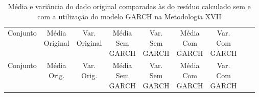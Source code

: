 \clearpage

\begin{center}
\begin{longtable}{ccccccccc}
\toprule
\rowcolor{white}
\caption[Metodologia XVII: dados estatísticos]{Média e variância do dado original
comparadas às do resíduo calculado sem e com a utilização do modelo GARCH na
Metodologia XVII} \label{tab:DadosEstatisticosMet17}\\
\midrule
    Conjunto & \specialcell{Média\\Original} &
    \specialcell{Var.\\Original} & \specialcell{Média\\Sem\\GARCH} &
    \specialcell{Var.\\Sem\\GARCH} & \specialcell{Média\\Com\\GARCH}&
    \specialcell{Var.\\Com\\GARCH} \\

\midrule
\endfirsthead 
\midrule
\rowcolor{white}
    Conjunto & \specialcell{Média\\Orig.} &
    \specialcell{Var.\\Orig.} & \specialcell{Média\\Sem\\GARCH} &
    \specialcell{Var.\\Sem\\GARCH} & \specialcell{Média\\Com\\GARCH}&
    \specialcell{Var.\\Com\\GARCH} \\


\end{longtable}
\end{center}
